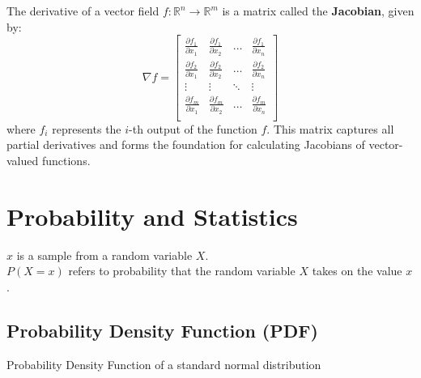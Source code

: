 The derivative of a vector field $f : \mathbb{R}^n \to \mathbb{R}^m$ is a matrix called the \textbf{Jacobian}, given by:
\[
\nabla f = 
\begin{bmatrix}
    \frac{\partial f_1}{\partial x_1} & \frac{\partial f_1}{\partial x_2} & \dots & \frac{\partial f_1}{\partial x_n} \\
    \frac{\partial f_2}{\partial x_1} & \frac{\partial f_2}{\partial x_2} & \dots & \frac{\partial f_2}{\partial x_n} \\
    \vdots & \vdots & \ddots & \vdots \\
    \frac{\partial f_m}{\partial x_1} & \frac{\partial f_m}{\partial x_2} & \dots & \frac{\partial f_m}{\partial x_n} \\
\end{bmatrix}
\]
where $f_i$ represents the $i$-th output of the function $f$. This matrix captures all partial derivatives and forms the foundation for calculating Jacobians of vector-valued functions.

\section{Probability and Statistics}

$x$ is a sample from a random variable $X$. \\

\noindent $P(X=x)$ refers to probability that the random variable $X$ takes on the value $x$.

\subsection{Probability Density Function (PDF)}
\begin{marginfigure}[100pt]
    \centering
    \caption{Probability Density Function of a standard normal distribution}
\end{marginfigure}

